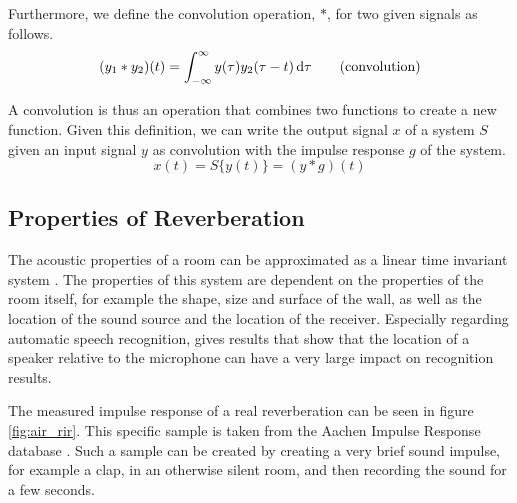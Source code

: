 Furthermore, we define the convolution operation, $*$, for two given signals as follows.
\[
 (y_1 * y_2)(t) = \int_{-\infty}^{\infty} y(\tau)y_2(\tau - t)  \mathop{}\!\mathrm{d}\tau \tag{convolution}
\]

A convolution is thus an operation that combines two functions to create a new function. Given this definition, we can write the output signal $x$ of a system $S$ given an input signal $y$ as convolution with the impulse response $g$ of the system. 
\[
x(t) = S\{y(t)\} = (y * g)(t)
\]

\subsection{Properties of Reverberation}

The acoustic properties of a room can be approximated as a linear time invariant system \cite{yoshioka2012making}. The properties of this system are dependent on the properties of the room itself, for example the shape, size and surface of the wall, as well as the location of the sound source and the location of the receiver. Especially regarding automatic speech recognition, \cite{ritter2016training} gives results that show that the location of a speaker relative to the microphone can have a very large impact on recognition results.

The measured impulse response of a real reverberation can be seen in figure \ref{fig:air_rir}. This specific sample is taken from the Aachen Impulse Response database \cite{jeub2009binaural}. Such a sample can be created by creating a very brief sound impulse, for example a clap, in an otherwise silent room, and then recording the sound for a few seconds. 

